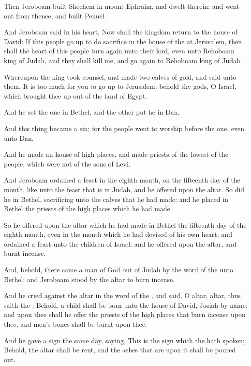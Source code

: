 \Verse Then Jeroboam built Shechem in mount Ephraim, and dwelt therein; and went out from thence, and built Penuel.

\Verse And Jeroboam said in his heart, Now shall the kingdom return to the house of David: \Verse If this people go up to do sacrifice in the house of the \LORD at Jerusalem, then shall the heart of this people turn again unto their lord, even unto Rehoboam king of Judah, and they shall kill me, and go again to Rehoboam king of Judah.

\Verse Whereupon the king took counsel, and made two calves of gold, and said unto them, It is too much for you to go up to Jerusalem: behold thy gods, O Israel, which brought thee up out of the land of Egypt.

\Verse And he set the one in Bethel, and the other put he in Dan.

\Verse And this thing became a sin: for the people went to worship before the one, even unto Dan.

\Verse And he made an house of high places, and made priests of the lowest of the people, which were not of the sons of Levi.

\Verse And Jeroboam ordained a feast in the eighth month, on the fifteenth day of the month, like unto the feast that is in Judah, and he offered upon the altar. So did he in Bethel, sacrificing unto the calves that he had made: and he placed in Bethel the priests of the high places which he had made.

\Verse So he offered upon the altar which he had made in Bethel the fifteenth day of the eighth month, even in the month which he had devised of his own heart; and ordained a feast unto the children of Israel: and he offered upon the altar, and burnt incense.


\Chapter
\Verse And, behold, there came a man of God out of Judah by the word of the \LORD unto Bethel: and Jeroboam stood by the altar to burn incense.

\Verse And he cried against the altar in the word of the \LORD, and said, O altar, altar, thus saith the \LORD; Behold, a child shall be born unto the house of David, Josiah by name; and upon thee shall he offer the priests of the high places that burn incense upon thee, and men's bones shall be burnt upon thee.

\Verse And he gave a sign the same day, saying, This is the sign which the \LORD hath spoken; Behold, the altar shall be rent, and the ashes that are upon it shall be poured out.

